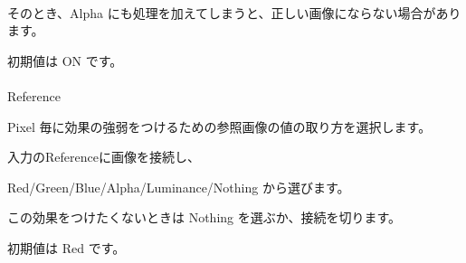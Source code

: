 \documentclass[a4paper,12pt]{article}
\begin{document}
\newpage

\thispagestyle{empty}

\ \vspace{-0.2em}
\par
そのとき、Alpha にも処理を加えてしまうと、正しい画像にならない場合があります。\par
初期値は ON です。\\
\\
Reference\par
Pixel 毎に効果の強弱をつけるための参照画像の値の取り方を選択します。\par
入力の\textquotedbl Reference\textquotedbl に画像を接続し、\par
Red/Green/Blue/Alpha/Luminance/Nothing から選びます。\par
この効果をつけたくないときは Nothing を選ぶか、接続を切ります。\par
初期値は Red です。
\end{document}
